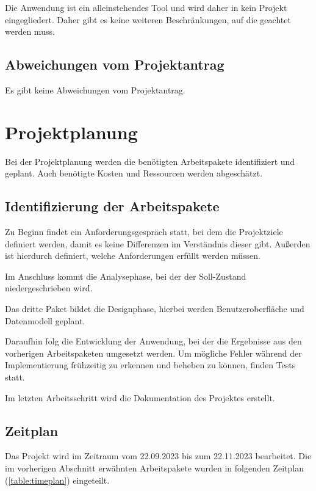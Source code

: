 \documentclass[12pt]{article}
\begin{document}
Die Anwendung ist ein alleinstehendes Tool und wird daher in kein Projekt 
eingegliedert. Daher gibt es keine weiteren Beschränkungen, auf die geachtet 
werden muss.  

\subsection{Abweichungen vom Projektantrag}
Es gibt keine Abweichungen vom Projektantrag.


%
%

\section{Projektplanung}
Bei der Projektplanung werden die benötigten Arbeitspakete identifiziert und geplant.
Auch benötigte Kosten und Ressourcen werden abgeschätzt.

\subsection{Identifizierung der Arbeitspakete}
Zu Beginn findet ein Anforderungsgespräch statt, bei dem die Projektziele 
definiert werden, damit es keine Differenzen im Verständnis dieser gibt. Außerden ist hierdurch
definiert, welche Anforderungen erfüllt werden müssen. 

Im Anschluss kommt die Analysephase, bei der der Soll-Zustand niedergeschrieben wird.  

Das dritte Paket bildet die Designphase, hierbei werden Benutzeroberfläche und 
Datenmodell geplant.  

Daraufhin folg die Entwicklung der Anwendung, bei der die Ergebnisse aus den 
vorherigen Arbeitspaketen umgesetzt werden. Um mögliche Fehler während der 
Implementierung frühzeitig zu erkennen und beheben zu können, finden Tests statt. 

Im letzten Arbeitsschritt wird die Dokumentation des Projektes erstellt. 

\subsection{Zeitplan}
Das Projekt wird im Zeitraum vom 22.09.2023 bis zum 22.11.2023 bearbeitet. 
Die im vorherigen Abschnitt erwähnten Arbeitspakete wurden in folgenden Zeitplan 
(\autoref{table:timeplan}) eingeteilt. 
\end{document}
